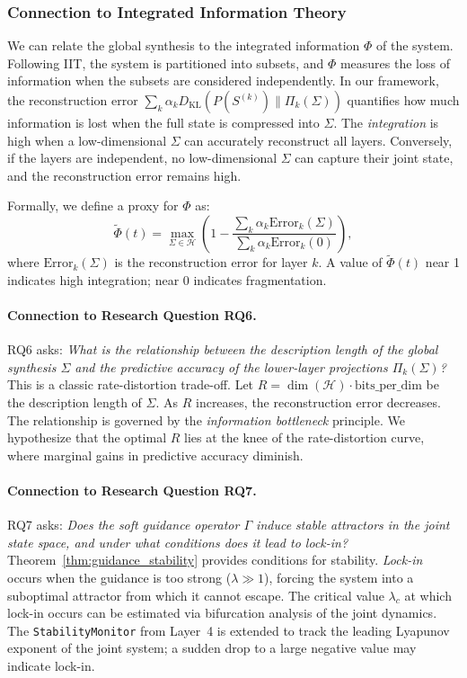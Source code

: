 \subsubsection{Connection to Integrated Information Theory}
We can relate the global synthesis to the integrated information $\Phi$ of the system. Following IIT, the system is partitioned into subsets, and $\Phi$ measures the loss of information when the subsets are considered independently. In our framework, the reconstruction error $\sum_k \alpha_k D_{\text{KL}}(P(S^{(k)}) \| \Pi_k(\Sigma))$ quantifies how much information is lost when the full state is compressed into $\Sigma$. The \emph{integration} is high when a low-dimensional $\Sigma$ can accurately reconstruct all layers. Conversely, if the layers are independent, no low-dimensional $\Sigma$ can capture their joint state, and the reconstruction error remains high.

Formally, we define a proxy for $\Phi$ as:
\[
\tilde{\Phi}(t) = \max_{\Sigma \in \mathcal{H}} \left( 1 - \frac{\sum_k \alpha_k \text{Error}_k(\Sigma)}{\sum_k \alpha_k \text{Error}_k(0)} \right),
\]
where $\text{Error}_k(\Sigma)$ is the reconstruction error for layer $k$. A value of $\tilde{\Phi}(t)$ near 1 indicates high integration; near 0 indicates fragmentation.

\paragraph{Connection to Research Question RQ6.}
RQ6 asks: \emph{What is the relationship between the description length of the global synthesis $\Sigma$ and the predictive accuracy of the lower-layer projections $\Pi_k(\Sigma)$?} This is a classic rate-distortion trade-off. Let $R = \dim(\mathcal{H}) \cdot \text{bits\_per\_dim}$ be the description length of $\Sigma$. As $R$ increases, the reconstruction error decreases. The relationship is governed by the \emph{information bottleneck} principle. We hypothesize that the optimal $R$ lies at the knee of the rate-distortion curve, where marginal gains in predictive accuracy diminish.

\paragraph{Connection to Research Question RQ7.}
RQ7 asks: \emph{Does the soft guidance operator $\Gamma$ induce stable attractors in the joint state space, and under what conditions does it lead to lock-in?} Theorem~\ref{thm:guidance_stability} provides conditions for stability. \emph{Lock-in} occurs when the guidance is too strong ($\lambda \gg 1$), forcing the system into a suboptimal attractor from which it cannot escape. The critical value $\lambda_c$ at which lock-in occurs can be estimated via bifurcation analysis of the joint dynamics. The \texttt{StabilityMonitor} from Layer~4 is extended to track the leading Lyapunov exponent of the joint system; a sudden drop to a large negative value may indicate lock-in.

